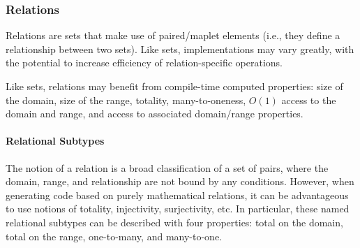 \documentclass{article}
\begin{document}
\subsubsection{Relations}
Relations are sets that make use of paired/maplet elements (i.e., they define a relationship between two sets). Like sets, implementations may vary greatly, with the potential to increase efficiency of relation-specific operations.


Like sets, relations may benefit from compile-time computed properties: size of the domain, size of the range, totality, many-to-oneness, $O(1)$ access to the domain and range, and access to associated domain/range properties.





\paragraph{Relational Subtypes}
The notion of a relation is a broad classification of a set of pairs, where the domain, range, and relationship are not bound by any conditions. However, when generating code based on purely mathematical relations, it can be advantageous to use notions of totality, injectivity, surjectivity, etc. In particular, these named relational subtypes can be described with four properties: total on the domain, total on the range, one-to-many, and many-to-one.
\end{document}
